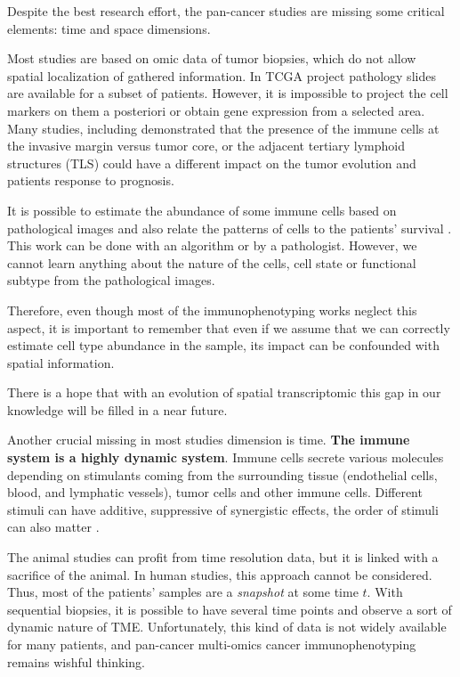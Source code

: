 \documentclass[12pt,]{book}
\theoremstyle{definition}
\theoremstyle{definition}
\theoremstyle{definition}
\theoremstyle{remark}
\begin{document}
Despite the best research effort, the pan-cancer studies are missing
some critical elements: time and space dimensions.

Most studies are based on omic data of tumor biopsies, which do not
allow spatial localization of gathered information. In TCGA project
pathology slides are available for a subset of patients. However, it is
impossible to project the cell markers on them a posteriori or obtain
gene expression from a selected area. Many studies, including
\citep{Bindea2014, Galon2018, Dieu-Nosjean2014, Sautes-Fridman2016}
demonstrated that the presence of the immune cells at the invasive
margin versus tumor core, or the adjacent tertiary lymphoid structures
(TLS) could have a different impact on the tumor evolution and patients
response to prognosis.

It is possible to estimate the abundance of some immune cells based on
pathological images and also relate the patterns of cells to the
patients' survival \citep{Saltz2018}. This work can be done with an
algorithm or by a pathologist. However, we cannot learn anything about
the nature of the cells, cell state or functional subtype from the
pathological images.

Therefore, even though most of the immunophenotyping works neglect this
aspect, it is important to remember that even if we assume that we can
correctly estimate cell type abundance in the sample, its impact can be
confounded with spatial information.

There is a hope that with an evolution of spatial transcriptomic this
gap in our knowledge will be filled in a near future.

Another crucial missing in most studies dimension is time. \textbf{The
immune system is a highly dynamic system}. Immune cells secrete various
molecules depending on stimulants coming from the surrounding tissue
(endothelial cells, blood, and lymphatic vessels), tumor cells and other
immune cells. Different stimuli can have additive, suppressive of
synergistic effects, the order of stimuli can also matter
\citep{Touzot2014}.

The animal studies can profit from time resolution data, but it is
linked with a sacrifice of the animal. In human studies, this approach
cannot be considered. Thus, most of the patients' samples are a
\emph{snapshot} at some time \(t\). With sequential biopsies, it is
possible to have several time points and observe a sort of dynamic
nature of TME. Unfortunately, this kind of data is not widely available
for many patients, and pan-cancer multi-omics cancer immunophenotyping
remains wishful thinking.
\end{document}
